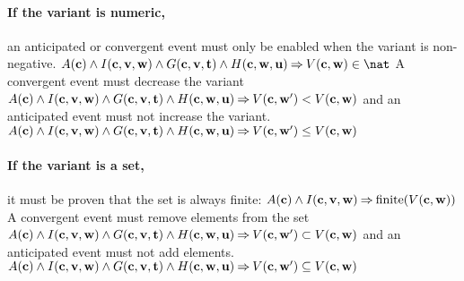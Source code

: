 \paragraph{If the variant is numeric,}
\label{po_numeric_variant}
  an anticipated or convergent event
  must only be enabled when the variant is non-negative.
%
  {$A(\allconstants) \land I(\allconstants,\absvariables,\concvariables) \land
    G(\allconstants,\absvariables,\absparameters) \land H(\allconstants,\concvariables,\concparameters)
    \limp V(\allconstants,\concvariables)\in\nat$}
A convergent event must decrease the variant
%
  {$A(\mathbf{c}) \land I(\mathbf{c},\mathbf{v},\mathbf{w}) \land
    G(\mathbf{c},\mathbf{v},\mathbf{t}) \land H(\mathbf{c},\mathbf{w},\mathbf{u})
    \mathbin\Rightarrow V(\mathbf{c},\mathbf{w}')<V(\mathbf{c},\mathbf{w})$}
and an anticipated event must not increase the variant.
%
  {$A(\mathbf{c}) \land I(\mathbf{c},\mathbf{v},\mathbf{w}) \land
    G(\mathbf{c},\mathbf{v},\mathbf{t}) \land H(\mathbf{c},\mathbf{w},\mathbf{u})
    \mathbin\Rightarrow V(\mathbf{c},\mathbf{w}')\leq V(\mathbf{c},\mathbf{w})$}

\paragraph{If the variant is a set,}
\label{po_set_variant}
  it must be proven that the set is always finite:
%
  {$A(\mathbf{c}) \land I(\mathbf{c},\mathbf{v},\mathbf{w}) \mathbin\Rightarrow \mathrm{finite}(V(\mathbf{c},\mathbf{w}))$}
A convergent event must remove elements from the set
%
  {$A(\mathbf{c}) \land I(\mathbf{c},\mathbf{v},\mathbf{w}) \land
    G(\mathbf{c},\mathbf{v},\mathbf{t}) \land H(\mathbf{c},\mathbf{w},\mathbf{u})
    \mathbin\Rightarrow V(\mathbf{c},\mathbf{w}')\subset V(\mathbf{c},\mathbf{w})$}
and an anticipated event must not add elements.
%
  {$A(\mathbf{c}) \land I(\mathbf{c},\mathbf{v},\mathbf{w}) \land
    G(\mathbf{c},\mathbf{v},\mathbf{t}) \land H(\mathbf{c},\mathbf{w},\mathbf{u})
    \mathbin\Rightarrow V(\mathbf{c},\mathbf{w}')\subseteq V(\mathbf{c},\mathbf{w})$}

